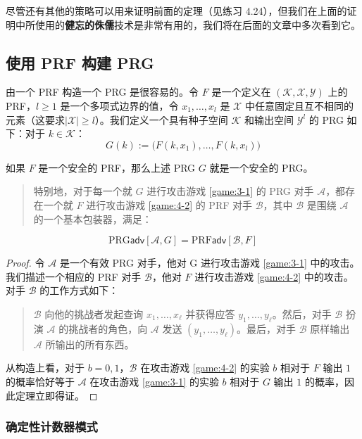 尽管还有其他的策略可以用来证明前面的定理（见练习 4.24），但我们在上面的证明中所使用的\textbf{健忘的侏儒}技术是非常有用的，我们将在后面的文章中多次看到它。

\subsection{使用 PRF 构建 PRG}\label{subsec:4-4-4}

由一个 PRF 构造一个 PRG 是很容易的。令 $F$ 是一个定义在 $(\mathcal{K},\mathcal{X},\mathcal{Y})$ 上的 PRF，$l\geq1$ 是一个多项式边界的值，令 $x_1,\dots,x_l$ 是 $\mathcal{X}$ 中任意固定且互不相同的元素（这要求$|\mathcal{X}|\geq l$）。我们定义一个具有种子空间 $\mathcal{K}$ 和输出空间 $\mathcal{Y}^l$ 的 PRG 如下：对于 $k\in\mathcal{K}$：
\[
G(k):=
\big(
F(k,x_1),\dots,F(k,x_l)
\big)
\]

\begin{theorem}\label{theo:4-8}
如果 $F$ 是一个安全的 PRF，那么上述 PRG $G$ 就是一个安全的 PRG。
\begin{quote}
特别地，对于每一个就 $G$ 进行攻击游戏 \ref{game:3-1} 的 PRG 对手 $\mathcal{A}$，都存在一个就 $F$ 进行攻击游戏 \ref{game:4-2} 的 PRF 对手 $\mathcal{B}$，其中 $\mathcal{B}$ 是围绕 $\mathcal{A}$ 的一个基本包装器，满足：
\end{quote}
\[
\mathrm{PRG}\mathsf{adv}[\mathcal{A},G]= 
\mathrm{PRF}\mathsf{adv}[\mathcal{B},F]
\]
\end{theorem}

\begin{proof}
令 $\mathcal{A}$ 是一个有效 PRG 对手，他对 G 进行攻击游戏 \ref{game:3-1} 中的攻击。我们描述一个相应的 PRF 对手 $\mathcal{B}$，他对 $F$ 进行攻击游戏 \ref{game:4-2} 中的攻击。对手 $\mathcal{B}$ 的工作方式如下：
\begin{quote}
$\mathcal{B}$ 向他的挑战者发起查询 $x_1,\dots,x_\ell$ 并获得应答 $y_1,\dots,y_\ell$。然后，对手 $\mathcal{B}$ 扮演 $\mathcal{A}$ 的挑战者的角色，向 $\mathcal{A}$ 发送 $(y_1,\dots,y_\ell)$。最后，对手 $\mathcal{B}$ 原样输出 $\mathcal{A}$ 所输出的所有东西。
\end{quote}

从构造上看，对于 $b=0,1$，$\mathcal{B}$ 在攻击游戏 \ref{game:4-2} 的实验 $b$ 相对于 $F$ 输出 $1$ 的概率恰好等于 $\mathcal{A}$ 在攻击游戏 \ref{game:3-1} 的实验 $b$ 相对于 $G$ 输出 $1$ 的概率，因此定理立即得证。
\end{proof}

\subsubsection{确定性计数器模式}

